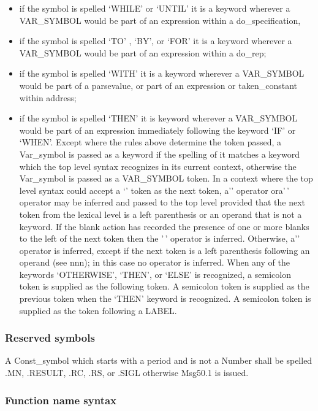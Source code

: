 \begin{itemize}
\item
  if the symbol is spelled `WHILE' or `UNTIL' it is a keyword wherever a
  VAR\_SYMBOL would be part of an expression within a do\_specification,
\item
  if the symbol is spelled `TO' , `BY', or `FOR' it is a keyword
  wherever a VAR\_SYMBOL would be part of an expression within a
  do\_rep;
\item
  if the symbol is spelled `WITH' it is a keyword wherever a VAR\_SYMBOL
  would be part of a parsevalue, or part of an expression or
  taken\_constant within address;
\item
  if the symbol is spelled `THEN' it is keyword wherever a VAR\_SYMBOL
  would be part of an expression immediately following the keyword `IF'
  or `WHEN'. Except where the rules above determine the token passed, a
  Var\_symbol is passed as a keyword if the spelling of it matches a
  keyword which the top level syntax recognizes in its current context,
  otherwise the Var\_symbol is passed as a VAR\_SYMBOL token. In a
  context where the top level syntax could accept a `\textbar\textbar{}'
  token as the next token, a'\textbar\textbar' operator ora'\,' operator
  may be inferred and passed to the top level provided that the next
  token from the lexical level is a left parenthesis or an operand that
  is not a keyword. If the blank action has recorded the presence of one
  or more blanks to the left of the next token then the '\,' operator is
  inferred. Otherwise, a'\textbar\textbar' operator is inferred, except
  if the next token is a left parenthesis following an operand (see
  nnn); in this case no operator is inferred. When any of the keywords
  `OTHERWISE', `THEN', or `ELSE' is recognized, a semicolon token is
  supplied as the following token. A semicolon token is supplied as the
  previous token when the `THEN' keyword is recognized. A semicolon
  token is supplied as the token following a LABEL.
\end{itemize}

\subsubsection{Reserved symbols}\label{reserved-symbols}

A Const\_symbol which starts with a period and is not a Number shall be
spelled .MN, .RESULT, .RC, .RS, or .SIGL otherwise Msg50.1 is issued.

\subsubsection{Function name syntax}\label{function-name-syntax}

